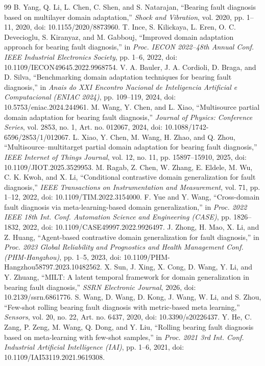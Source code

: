 \documentclass[machines,article,submit,oneauthor,pdftex]{Definitions/mdpi}
\begin{document}
\begin{thebibliography}{99}
 B. Yang, Q. Li, L. Chen, C. Shen, and S. Natarajan, ``Bearing fault diagnosis based on multilayer domain adaptation,'' \emph{Shock and Vibration}, vol. 2020, pp. 1--11, 2020, doi: 10.1155/2020/8873960.
 T. Ince, S. Kilickaya, L. Eren, O. C. Devecioglu, S. Kiranyaz, and M. Gabbouj, ``Improved domain adaptation approach for bearing fault diagnosis,'' in \emph{Proc. IECON 2022--48th Annual Conf. IEEE Industrial Electronics Society}, pp. 1--6, 2022, doi: 10.1109/IECON49645.2022.9968754.
 V. A. Bauler, J. A. Cordioli, D. Braga, and D. Silva, ``Benchmarking domain adaptation techniques for bearing fault diagnosis,'' in \emph{Anais do XXI Encontro Nacional de Inteligencia Artificial e Computacional (ENIAC 2024)}, pp. 109--119, 2024, doi: 10.5753/eniac.2024.244961.
 M. Wang, Y. Chen, and L. Xiao, ``Multisource partial domain adaptation for bearing fault diagnosis,'' \emph{Journal of Physics: Conference Series}, vol. 2853, no. 1, Art. no. 012067, 2024, doi: 10.1088/1742-6596/2853/1/012067.
 L. Xiao, Y. Chen, M. Wang, H. Zhao, and Q. Zhou, ``Multisource--multitarget partial domain adaptation for bearing fault diagnosis,'' \emph{IEEE Internet of Things Journal}, vol. 12, no. 11, pp. 15897--15910, 2025, doi: 10.1109/JIOT.2025.3529953.
 M. Ragab, Z. Chen, W. Zhang, E. Eldele, M. Wu, C. K. Kwoh, and X. Li, ``Conditional contrastive domain generalization for fault diagnosis,'' \emph{IEEE Transactions on Instrumentation and Measurement}, vol. 71, pp. 1--12, 2022, doi: 10.1109/TIM.2022.3154000.
 F. Yue and Y. Wang, ``Cross-domain fault diagnosis via meta-learning-based domain generalization,'' in \emph{Proc. 2022 IEEE 18th Int. Conf. Automation Science and Engineering (CASE)}, pp. 1826--1832, 2022, doi: 10.1109/CASE49997.2022.9926497.
 J. Zhong, H. Mao, X. Li, and Z. Huang, ``Agent-based contrastive domain generalization for fault diagnosis,'' in \emph{Proc. 2023 Global Reliability and Prognostics and Health Management Conf. (PHM-Hangzhou)}, pp. 1--5, 2023, doi: 10.1109/PHM-Hangzhou58797.2023.10482562.
 X. Sun, J. Xing, X. Cong, D. Wang, Y. Li, and Y. Zhuang, ``MILT: A latent temporal framework for domain generalization in bearing fault diagnosis,'' \emph{SSRN Electronic Journal}, 2026, doi: 10.2139/ssrn.6861776.
 S. Wang, D. Wang, D. Kong, J. Wang, W. Li, and S. Zhou, ``Few-shot rolling bearing fault diagnosis with metric-based meta learning,'' \emph{Sensors}, vol. 20, no. 22, Art. no. 6437, 2020, doi: 10.3390/s20226437.
 Y. He, C. Zang, P. Zeng, M. Wang, Q. Dong, and Y. Liu, ``Rolling bearing fault diagnosis based on meta-learning with few-shot samples,'' in \emph{Proc. 2021 3rd Int. Conf. Industrial Artificial Intelligence (IAI)}, pp. 1--6, 2021, doi: 10.1109/IAI53119.2021.9619308.

\end{thebibliography}
\end{document}
